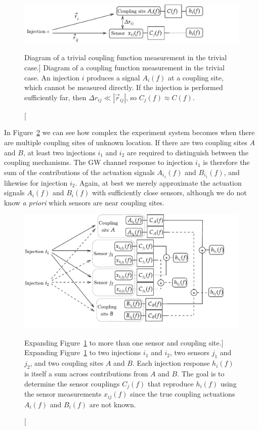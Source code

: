 \begin{figure}[h]
	\includegraphics[width=\textwidth]{figures/noise-methods/cf-cartoon-simple.pdf}
	\caption
	[Diagram of a trivial coupling function measurement in the trivial case.]
	{
		Diagram of a coupling function measurement in the trivial case.
		An injection $i$ produces a signal $A_i(f)$ at a coupling site, which cannot be measured directly.
		If the injection is performed sufficiently far, then $\Delta r_{ij} \ll |\vec{r}_{ij}|$, so $C_j(f) \approx C(f)$.
	}
	\label{fig:cf-cartoon-simple}
\end{figure}

In Figure~\ref{fig:cf-cartoon-full} we can see how complex the experiment system becomes when there are multiple coupling sites of unknown location.
If there are two coupling sites $A$ and $B$, at least two injections $i_1$ and $i_2$ are required to distinguish between the coupling mechanisms.
The \ac{GW} channel response to injection $i_1$ is therefore the sum of the contributions of the actuation signals $A_{i_1}(f)$ and $B_{i_1}(f)$, and likewise for injection ${i_2}$.
Again, at best we merely approximate the actuation signals $A_i(f)$ and $B_i(f)$ with sufficiently close sensors, although we do not know \textit{a priori} which sensors are near coupling sites.

\begin{figure}[h]
	\includegraphics[width=\textwidth]{figures/noise-methods/cf-cartoon-full.pdf}
	\caption
	[Expanding Figure~\ref{fig:cf-cartoon-simple} to more than one sensor and coupling site.]
	{
		Expanding Figure~\ref{fig:cf-cartoon-simple} to two injections $i_1$ and $i_2$, two sensors $j_1$ and $j_2$, and two coupling sites $A$ and $B$.
		Each injection response $h_i(f)$ is itself a sum across contributions from $A$ and $B$.
		The goal is to determine the sensor couplings $C_j(f)$ that reproduce $h_i(f)$ using the sensor measurements $x_{ij}(f)$ since the true coupling actuations $A_i(f)$ and $B_i(f)$ are not known.
	}
	\label{fig:cf-cartoon-full}
\end{figure}

